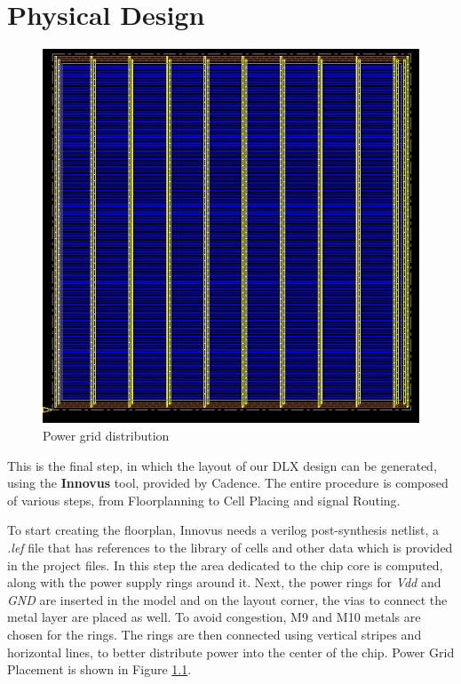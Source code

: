 \chapter{Physical Design}
\label{physical_design}

	\begin{figure}[ht]
	\centering
	\includegraphics[width=\textwidth]{chapters/figures/4.horizontal_lines.jpg} 
	\caption{Power grid distribution}
	\label{fig:power_distribution}  %
	\end{figure}

This is the final step, in which the layout of our DLX design can be generated, using the \textbf{Innovus} tool, provided by Cadence.
The entire procedure is composed of various steps, from Floorplanning to Cell Placing and signal Routing.

To start creating the floorplan, Innovus needs a verilog post-synthesis netlist, a \textit{.lef} file that has references to the library of cells and other data which is
provided in the project files. In this step the area dedicated to the chip core is computed, along with the power supply rings around it.
Next, the power rings for \textit{Vdd} and \textit{GND} are inserted in the model and on the layout corner, the vias to connect the metal layer are placed as well. To avoid congestion, M9 and M10 metals are chosen for the rings.
The rings are then connected using vertical stripes and horizontal lines, to better distribute power into the center of the chip.
Power Grid Placement is shown in Figure \ref{fig:power_distribution}.

